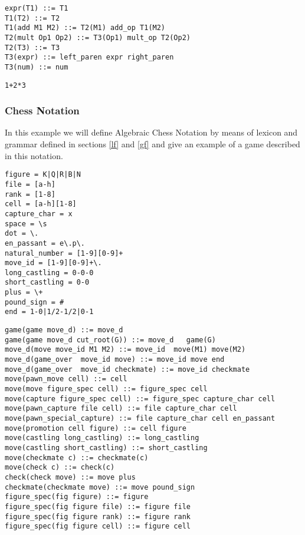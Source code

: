 \documentclass[a4paper,10pt]{article}
\newcounter{subsubsubsection}[subsubsection]
\begin{document}
\begin{verbatim}
expr(T1) ::= T1
T1(T2) ::= T2
T1(add M1 M2) ::= T2(M1) add_op T1(M2)
T2(mult Op1 Op2) ::= T3(Op1) mult_op T2(Op2)
T2(T3) ::= T3
T3(expr) ::= left_paren expr right_paren
T3(num) ::= num   
\end{verbatim}
 
\label{asf}
\begin{verbatim}
1+2*3
\end{verbatim}
\subsubsection{Chess Notation}
In this example we will define Algebraic Chess Notation \cite{chess} by means of lexicon and grammar defined in sections \ref{lf} and \ref{gf} and give an example of a game described in this notation. 
\label{clex}
\begin{verbatim}
figure = K|Q|R|B|N
file = [a-h]
rank = [1-8]
cell = [a-h][1-8]
capture_char = x
space = \s
dot = \.
en_passant = e\.p\.
natural_number = [1-9][0-9]+
move_id = [1-9][0-9]+\.
long_castling = 0-0-0
short_castling = 0-0
plus = \+
pound_sign = #
end = 1-0|1/2-1/2|0-1
\end{verbatim}
\label{cgram}
\begin{verbatim}
game(game move_d) ::= move_d 
game(game move_d cut_root(G)) ::= move_d   game(G)
move_d(move move_id M1 M2) ::= move_id  move(M1) move(M2)
move_d(game_over  move_id move) ::= move_id move end
move_d(game_over  move_id checkmate) ::= move_id checkmate 
move(pawn_move cell) ::= cell
move(move figure_spec cell) ::= figure_spec cell
move(capture figure_spec cell) ::= figure_spec capture_char cell
move(pawn_capture file cell) ::= file capture_char cell
move(pawn_special_capture) ::= file capture_char cell en_passant
move(promotion cell figure) ::= cell figure
move(castling long_castling) ::= long_castling
move(castling short_castling) ::= short_castling
move(checkmate c) ::= checkmate(c)
move(check c) ::= check(c)
check(check move) ::= move plus
checkmate(checkmate move) ::= move pound_sign
figure_spec(fig figure) ::= figure
figure_spec(fig figure file) ::= figure file
figure_spec(fig figure rank) ::= figure rank
figure_spec(fig figure cell) ::= figure cell
\end{verbatim}
\end{document}
